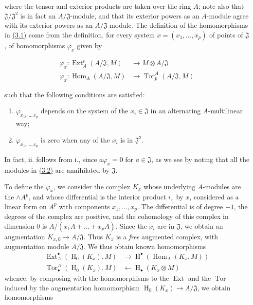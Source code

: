 \documentclass{article}
\newenvironment{eqenv}
  {}
  {}
\newcommand{\oldpage}[1]{\marginpar{\footnotesize$\Big\vert$ \textit{p.~#1}}}
\theoremstyle{definition}
\theoremstyle{definition}
\theoremstyle{definition}
\theoremstyle{definition}
\theoremstyle{remark}
\begin{document}
where the tensor and exterior products are taken over the ring \(A\);
note also that \({\mathfrak{J}}/{\mathfrak{J}}^2\) is in fact an \(A/{\mathfrak{J}}\)-module, and that its exterior powers as an \(A\)-module agree with its exterior powers as an \(A/{\mathfrak{J}}\)-module.
The definition of the homomorphisms in \protect\hyperlink{fga-1-equation-3.1}{(3.1)} come from the definition, for every system \(x=(x_1,\ldots,x_p)\) of points of \({\mathfrak{J}}\), of homomorphisms \(\varphi_x\) given by

\leavevmode{}%
\begin{eqenv}
\[
  \begin{aligned}
    \varphi_x\colon \operatorname{Ext}_A^p(A/{\mathfrak{J}},M) &\to M\otimes A/{\mathfrak{J}}
  \\\varphi_x\colon \operatorname{Hom}_A(A/{\mathfrak{J}},M) &\to \operatorname{Tor}_p^A(A/{\mathfrak{J}},M)
  \end{aligned}
\tag{3.2}
\]

\end{eqenv}

\oldpage{149-06}such that the following conditions are satisfied:

\begin{enumerate}
\def\labelenumi{\roman{enumi}.}
\item
  \(\varphi_{x_1,\ldots,x_p}\) depends on the system of the \(x_i\in{\mathfrak{J}}\) in an alternating \(A\)-multilinear way;
\item
  \(\varphi_{x_1,\ldots,x_p}\) is zero when any of the \(x_i\) is in \({\mathfrak{J}}^2\).
\end{enumerate}

In fact, ii. follows from i., since \(a\varphi_x=0\) for \(a\in{\mathfrak{J}}\), as we see by noting that all the modules in \protect\hyperlink{fga-1-equation-3.2}{(3.2)} are annihilated by \({\mathfrak{J}}\).

To define the \(\varphi_x\), we consider the complex \(K_x\) whose underlying \(A\)-modules are the \(\wedge A^p\), and whose differential is the interior product \(i_x\) by \(x\), considered as a linear form on \(A^p\) with components \(x_1,\ldots,x_p\).
The differential is of degree \(-1\), the degrees of the complex are positive, and the cohomology of this complex in dimension \(0\) is \(A/(x_1A+\ldots+x_pA)\).
Since the \(x_i\) are in \({\mathfrak{J}}\), we obtain an augmentation \(K_{x,0}\to A/{\mathfrak{J}}\).
Thus \(K_x\) is a \emph{free} augmented complex, with augmentation module \(A/{\mathfrak{J}}\).
We thus obtain known homomorphisms
\[
  \begin{aligned}
    \operatorname{Ext}_A^\bullet(\operatorname{H}_0(K_x),M) &\to \operatorname{H}^\bullet(\operatorname{Hom}_A(K_x,M))
  \\\operatorname{Tor}_\bullet^A(\operatorname{H}_0(K_x),M) &\leftarrow\operatorname{H}_\bullet(K_x\otimes M)
  \end{aligned}
\]
whence, by composing with the homomorphisms to the \(\operatorname{Ext}\) and the \(\operatorname{Tor}\) induced by the augmentation homomorphism \(\operatorname{H}_0(K_x)\to A/{\mathfrak{J}}\), we obtain homomorphisms
\end{document}
